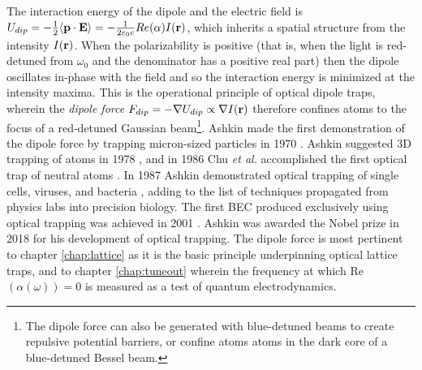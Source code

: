 	The interaction energy of the dipole and the electric field is $U_{dip} = -\frac{1}{2}\langle\textbf{p}\cdot\textbf{E}\rangle = -\frac{1}{2\varepsilon_0 c}Re(\alpha)I(\textbf{r})$, which inherits a spatial structure from the intensity $I(\textbf{r})$.
	When the polarizability is positive (that is, when the light is red-detuned from $\omega_0$ and the denominator has a positive real part) then the dipole oscillates in-phase with the field and so the interaction energy is minimized at the intensity maxima.
	This is the operational principle of optical dipole traps, wherein the \emph{dipole force} $F_{dip} = -\nabla U_{dip} \propto \nabla I(\textbf{r})$ therefore confines atoms to the focus of a red-detuned Gaussian beam\footnote{The dipole force can also be generated with blue-detuned beams to create repulsive potential barriers, or confine atoms atoms in the dark core of a blue-detuned Bessel beam.}.
	Ashkin made the first demonstration of the dipole force by trapping micron-sized particles in 1970 \cite{Ashkin70}.
	Ashkin suggested 3D trapping of atoms in 1978 \cite{Ashkin78}, and in 1986 Chu \emph{et al.} accomplished the first optical trap of neutral atoms \cite{Chu86}. 
	In 1987 Ashkin demonstrated optical trapping of single cells, viruses, and bacteria \cite{Ashkin87cell, Ashkin87virus}, adding to the list of techniques propagated from physics labs into precision biology.
	The first BEC produced exclusively using optical trapping was achieved in 2001 \cite{Barrett01}.
	Ashkin was awarded the Nobel prize in 2018 for his development of optical trapping.
	The dipole force is most pertinent to chapter \ref{chap:lattice} as it is the basic principle underpinning optical lattice traps, and to chapter \ref{chap:tuneout} wherein the frequency at which Re$(\alpha(\omega))=0$ is measured as a test of quantum electrodynamics.
	


